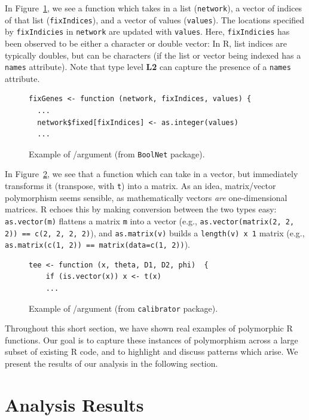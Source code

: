 \documentclass[acmsmall,10pt,review,anonymous]{acmart}\settopmatter{printfolios=true,printccs=false,printacmref=false}
\newcommand{\code}[1]{\lstinline|#1|\xspace}
\begin{document}
In Figure~\ref{fig:chardbl}, we see a function which takes in a list ({\tt network}), a vector of indices of that list ({\tt fixIndices}), and a
vector of values ({\tt values}).  The locations specified by {\tt fixIndicies} in {\tt network} are updated with {\tt values}.  Here, {\tt fixIndicies} has been observed to be either a character or double vector:
In R, list indices are typically doubles, but can be characters (if the list
or vector being indexed has a {\tt names} attribute).
Note that type level {\bf L2} can capture the presence of a {\tt names} attribute.

\begin{figure}[!hb]{\small\begin{lstlisting}[style=R]
fixGenes <- function (network, fixIndices, values) {
  ...
  network$fixed[fixIndices] <- as.integer(values)
  ...
\end{lstlisting}}\caption{Example of \C/\D argument (from {\tt BoolNet} package).}\label{fig:chardbl}\end{figure}

In Figure~\ref{fig:matvec}, we see that a function which can take in a vector,
but immediately transforms it (transpose, with {\tt t}) into a matrix.  As
an idea, matrix/vector polymorphism seems sensible, as mathematically
vectors {\it are} one-dimensional matrices.  R echoes this by making conversion between the two
types easy: \code{as.vector(m)} flattens a matrix \code{m} into a vector
(e.g., \code{as.vector(matrix(2, 2, 2)) == c(2, 2, 2, 2)}), and
\code{as.matrix(v)} builds a {\tt length(v) x 1} matrix (e.g.,
\code{as.matrix(c(1, 2)) == matrix(data=c(1, 2))}).  
  
\begin{figure}[!hb]{\small\begin{lstlisting}[style=R]
tee <- function (x, theta, D1, D2, phi)  {
    if (is.vector(x)) x <- t(x)
    ...
\end{lstlisting}}\caption{Example of /\D argument (from {\tt calibrator} package).}\label{fig:matvec}\end{figure}

Throughout this short section, we have shown real examples of polymorphic R functions.
Our goal is to capture these instances of polymorphism across a large subset of existing R code, and to highlight and discuss patterns which arise.
We present the results of our analysis in the following section.

%
%
%
%
%
%
\section{Analysis Results}\label{sec:results}
\end{document}
